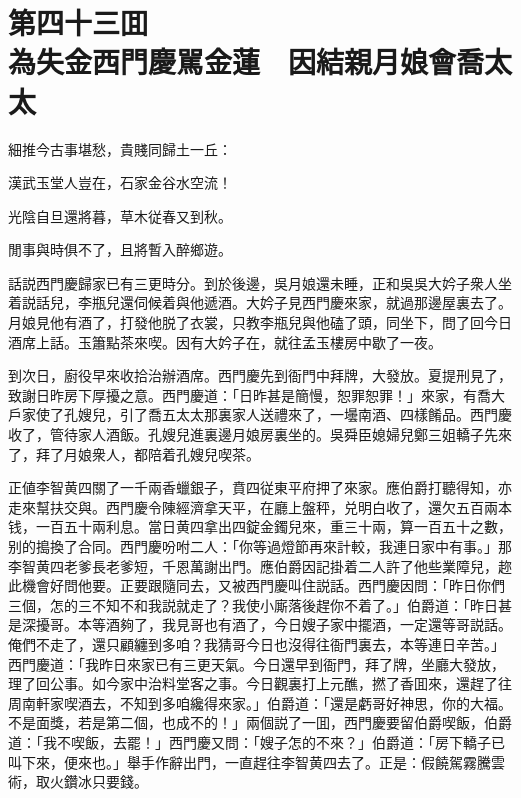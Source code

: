 
\chapter*{第四十三囬　\\為失金西門慶駡金蓮　因結親月娘會喬太太}


\begin{myquote}
細推今古事堪愁，貴賤同歸土一丘：

漢武玉堂人豈在，石家金谷水空流！

光陰自旦還將暮，草木従春又到秋。

閒事與時俱不了，且將暫入醉鄉遊。
\end{myquote}

話説西門慶歸家已有三更時分。到於後邊，吳月娘還未睡，正和吳吳大妗子衆人坐着説話兒，李瓶兒還伺候着與他遞酒。大妗子見西門慶來家，就過那邊屋裏去了。月娘見他有酒了，打發他脱了衣裳，只教李瓶兒與他磕了頭，同坐下，問了回今日酒席上話。玉簫點茶來喫。因有大妗子在，就往孟玉樓房中歇了一夜。

到次日，廚役早來收拾治辦酒席。西門慶先到衙門中拜牌，大發放。夏提刑見了，致謝日昨房下厚擾之意。西門慶道：「日昨甚是簡慢，恕罪恕罪！」來家，有喬大戶家使了孔嫂兒，引了喬五太太那裏家人送禮來了，一壜南酒、四樣餚品。西門慶收了，管待家人酒飯。孔嫂兒進裏邊月娘房裏坐的。吳舜臣媳婦兒鄭三姐轎子先來了，拜了月娘衆人，都陪着孔嫂兒喫茶。

正値李智黄四關了一千兩香蠟銀子，賁四従東平府押了來家。應伯爵打聽得知，亦走來幫扶交與。西門慶令陳經濟拿天平，在廳上盤秤，兑明白收了，還欠五百兩本钱，一百五十兩利息。當日黄四拿出四錠金鐲兒來，重三十兩，算一百五十之數，别的搗換了合同。西門慶吩咐二人：「你等過燈節再來計較，我連日家中有事。」那李智黄四老爹長老爹短，千恩萬謝出門。應伯爵因記掛着二人許了他些業障兒，趂此機會好問他要。正要跟隨同去，又被西門慶叫住説話。西門慶因問：「昨日你們三個，怎的三不知不和我説就走了？我使小廝落後趕你不着了。」伯爵道：「昨日甚是深擾哥。本等酒夠了，我見哥也有酒了，今日嫂子家中擺酒，一定還等哥説話。俺們不走了，還只顧纏到多咱？我猜哥今日也沒得往衙門裏去，本等連日辛苦。」西門慶道：「我昨日來家已有三更天氣。今日還早到衙門，拜了牌，坐廳大發放，理了回公事。如今家中治料堂客之事。今日觀裏打上元醮，撚了香囬來，還趕了往周南軒家喫酒去，不知到多咱纔得來家。」伯爵道：「還是虧哥好神思，你的大福。不是面獎，若是第二個，也成不的！」兩個説了一囬，西門慶要留伯爵喫飯，伯爵道：「我不喫飯，去罷！」西門慶又問：「嫂子怎的不來？」伯爵道：「房下轎子已叫下來，便來也。」舉手作辭出門，一直趕往李智黄四去了。正是：假饒駕霧騰雲術，取火鑽冰只要錢。

